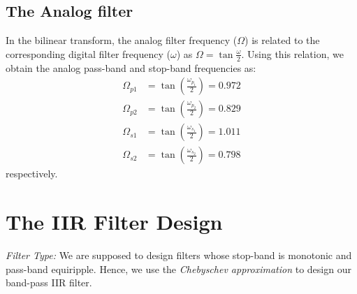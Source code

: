 \documentclass{article}
\begin{document}
\subsection{The Analog filter}
In the bilinear transform, the analog filter frequency ($\Omega$) is related to the corresponding digital filter frequency ($\omega$) as $\Omega = \tan \frac{\omega}{2}$.  Using this relation, we obtain the analog pass-band and stop-band frequencies as:
\begin{align*}
\Omega_{p1} &= \tan\left(\frac{\omega_{p_1}}{2}\right) = 0.972\\ 
\Omega_{p2} &= \tan\left(\frac{\omega_{p_2}}{2}\right) = 0.829\\
\Omega_{s1} &= \tan\left(\frac{\omega_{s_1}}{2}\right) = 1.011\\
\Omega_{s2} &= \tan\left(\frac{\omega_{s_2}}{2}\right) =  0.798
\end{align*}
respectively.

\section{The IIR Filter Design}
{\em Filter Type:}  We are supposed to design filters whose stop-band is monotonic and pass-band equiripple.  
Hence, we use the {\em Chebyschev approximation} to design our band-pass IIR filter.
\end{document}
